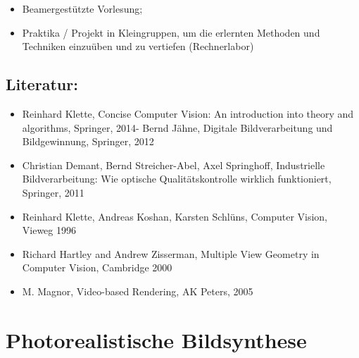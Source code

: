 \begin{itemize}
\tightlist
\item
  Beamergestützte Vorlesung;
\item
  Praktika / Projekt in Kleingruppen, um die erlernten Methoden und
  Techniken einzuüben und zu vertiefen (Rechnerlabor)
\end{itemize}

\section*{Literatur:\label{/mi-2017/modulbeschreibungen-master/MA_VC_Modul_BildbasierteComputergrafik}}\label{literaturpathlabelmi-2017modulbeschreibungen-mastermaux5fvcux5fmodulux5fbildbasiertecomputergrafik}

\begin{itemize}
\tightlist
\item
  Reinhard Klette, Concise Computer Vision: An introduction into theory
  and algorithms, Springer, 2014- Bernd Jähne, Digitale Bildverarbeitung
  und Bildgewinnung, Springer, 2012
\item
  Christian Demant, Bernd Streicher-Abel, Axel Springhoff, Industrielle
  Bildverarbeitung: Wie optische Qualitätskontrolle wirklich
  funktioniert, Springer, 2011
\item
  Reinhard Klette, Andreas Koshan, Karsten Schlüns, Computer Vision,
  Vieweg 1996
\item
  Richard Hartley and Andrew Zisserman, Multiple View Geometry in
  Computer Vision, Cambridge 2000
\item
  M. Magnor, Video-based Rendering, AK Peters, 2005
\end{itemize}

\chapter{Photorealistische
Bildsynthese\label{/mi-2017/modulbeschreibungen-master/MA_VC_Modul_PhotorealistischeBildsynthese}}\label{photorealistische-bildsynthesepathlabelmi-2017modulbeschreibungen-mastermaux5fvcux5fmodulux5fphotorealistischebildsynthese}


